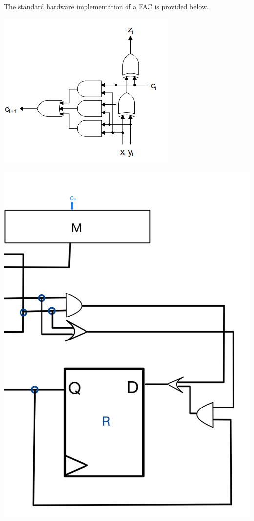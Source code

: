 \documentclass[12pt, letterpaper]{article}
\begin{document}
The standard hardware implementation of a FAC is provided below.

\begin{center}
\includegraphics[scale=0.5]{Documentation/FAC}
\end{center}

\begin{center}
\includegraphics[scale=0.3]{Documentation/ALU_2}
\end{center}
\end{document}
